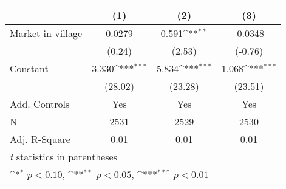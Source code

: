 {
\def\sym#1{\ifmmode^{#1}\else\(^{#1}\)\fi}
\begin{tabular}{l*{3}{c}}
\toprule
                    &\multicolumn{1}{c}{(1)}         &\multicolumn{1}{c}{(2)}         &\multicolumn{1}{c}{(3)}         \\
\midrule
Market in village   &      0.0279         &       0.591\sym{**} &     -0.0348         \\
                    &      (0.24)         &      (2.53)         &     (-0.76)         \\
\addlinespace
Constant            &       3.330\sym{***}&       5.834\sym{***}&       1.068\sym{***}\\
                    &     (28.02)         &     (23.28)         &     (23.51)         \\
\addlinespace
Add. Controls       &         Yes         &         Yes         &         Yes         \\
\midrule
N                   &        2531         &        2529         &        2530         \\
Adj. R-Square       &        0.01         &        0.01         &        0.01         \\
\bottomrule
\multicolumn{4}{l}{\footnotesize \textit{t} statistics in parentheses}\\
\multicolumn{4}{l}{\footnotesize \sym{*} \(p<0.10\), \sym{**} \(p<0.05\), \sym{***} \(p<0.01\)}\\
\end{tabular}
}
